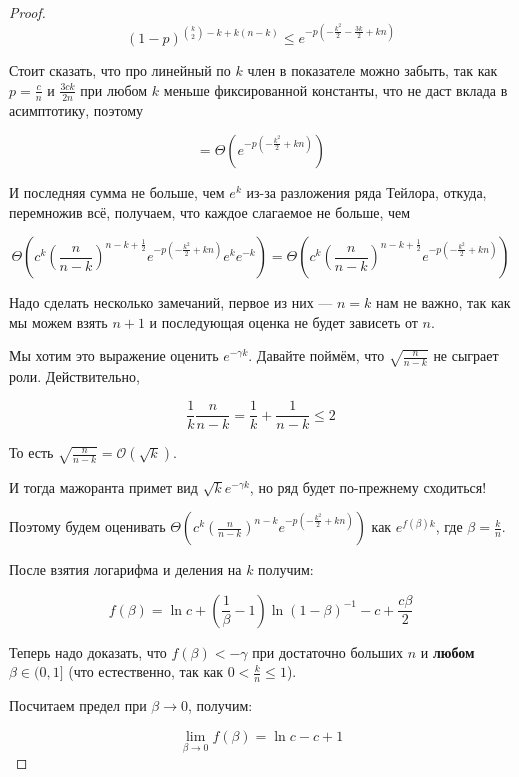 \begin{proof}
  \[
    (1 - p)^{\binom{k}{2} - k + k(n - k)} \leq 
    e^{-p\left(-\frac{k^2}{2} - \frac{3k}{2} + kn\right)}
  \]

  Стоит сказать, что про линейный по $k$ член в показателе можно забыть, так как
  $p = \frac{c}{n}$ и $\frac{3ck}{2n}$ при любом $k$ меньше фиксированной 
  константы, что не даст вклада в асимптотику, поэтому

  \[
    = \Theta\left(e^{-p\left(-\frac{k^2}{2} + kn\right)}\right)
  \]

  И последняя сумма не больше, чем $e^k$ из-за разложения ряда Тейлора, откуда,
  перемножив всё, получаем, что каждое слагаемое не больше, чем

  \[
    \Theta\left(c^k \left(\frac{n}{n - k}\right)^{n - k + \frac12} 
    e^{-p\left(-\frac{k^2}{2} + kn\right)} e^k e^{-k}\right) =
    \Theta\left(c^k \left(\frac{n}{n - k}\right)^{n - k + \frac12} 
    e^{-p\left(-\frac{k^2}{2} + kn\right)}\right)
  \]

  Надо сделать несколько замечаний, первое из них --- $n = k$ нам не важно, так
  как мы можем взять $n + 1$ и последующая оценка не будет зависеть от $n$.

  Мы хотим это выражение оценить $e^{-\gamma k}$. Давайте поймём, что 
  $\sqrt{\frac{n}{n - k}}$ не сыграет роли. Действительно, 

  \[
    \frac1k\frac{n}{n - k} = \frac1k + \frac{1}{n - k} \leq 2
  \]

  То есть $\sqrt{\frac{n}{n - k}} = \mathcal{O}(\sqrt{k})$.

  И тогда мажоранта примет вид $\sqrt{k}e^{-\gamma k}$, но ряд будет по-прежнему
  сходиться!

  Поэтому будем оценивать 
  $\Theta\left(c^k \left(\frac{n}{n - k}\right)^{n - k} 
    e^{-p\left(-\frac{k^2}{2} + kn\right)}\right)$ как $e^{f(\beta) k}$, где
  $\beta = \frac{k}{n}$.

  После взятия логарифма и деления на $k$ получим:

  \[
    f(\beta) = \ln c + \left(\frac{1}{\beta} - 1\right)\ln (1 - \beta)^{-1} - c + \frac{c\beta}{2}
  \]

  Теперь надо доказать, что $f(\beta) < -\gamma$ при достаточно больших $n$ и
  \textbf{любом} $\beta \in (0, 1]$ (что естественно, так как $0 < \frac{k}{n}
  \leq 1$).

  Посчитаем предел при $\beta \to 0$, получим:

  \[
    \lim\limits_{\beta \to 0} f(\beta) = \ln c - c + 1
  \]


\end{proof}
